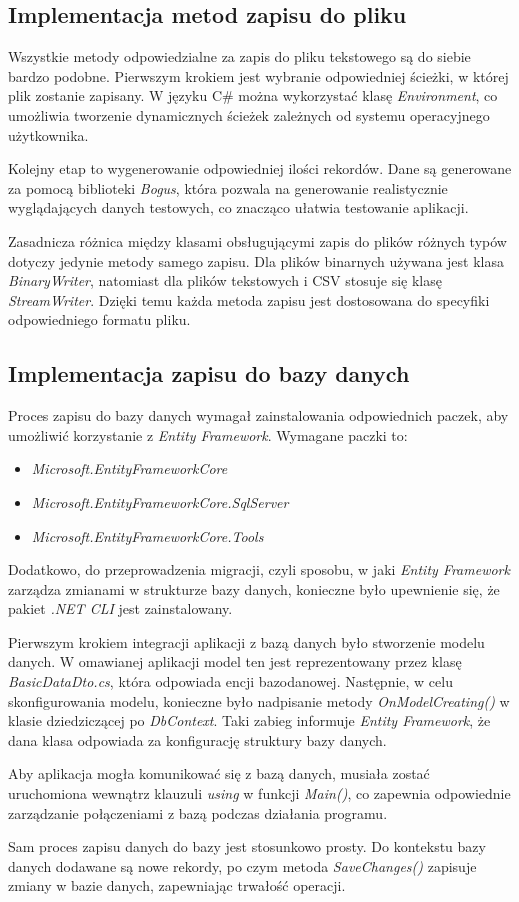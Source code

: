 \documentclass{report}
\begin{document}
\subsection{\Large Implementacja metod zapisu do pliku}

Wszystkie metody odpowiedzialne za zapis do pliku tekstowego są do siebie bardzo podobne. Pierwszym krokiem jest wybranie odpowiedniej ścieżki, w której plik zostanie zapisany. W języku C\# można wykorzystać klasę \textit{Environment}, co umożliwia tworzenie dynamicznych ścieżek zależnych od systemu operacyjnego użytkownika.

Kolejny etap to wygenerowanie odpowiedniej ilości rekordów. Dane są generowane za pomocą biblioteki \textit{Bogus}, która pozwala na generowanie realistycznie wyglądających danych testowych, co znacząco ułatwia testowanie aplikacji.

Zasadnicza różnica między klasami obsługującymi zapis do plików różnych typów dotyczy jedynie metody samego zapisu. Dla plików binarnych używana jest klasa \textit{BinaryWriter}, natomiast dla plików tekstowych i CSV stosuje się klasę \textit{StreamWriter}. Dzięki temu każda metoda zapisu jest dostosowana do specyfiki odpowiedniego formatu pliku.

\subsection{\Large Implementacja zapisu do bazy danych}

Proces zapisu do bazy danych wymagał zainstalowania odpowiednich paczek, aby umożliwić korzystanie z \textit{Entity Framework}. Wymagane paczki to: 
\begin{itemize} 
    \item \textit{Microsoft.EntityFrameworkCore} 
    \item \textit{Microsoft.EntityFrameworkCore.SqlServer} 
    \item \textit{Microsoft.EntityFrameworkCore.Tools} 
\end{itemize}

Dodatkowo, do przeprowadzenia migracji, czyli sposobu, w jaki \textit{Entity Framework} zarządza zmianami w strukturze bazy danych, konieczne było upewnienie się, że pakiet \textit{.NET CLI} jest zainstalowany.

Pierwszym krokiem integracji aplikacji z bazą danych było stworzenie modelu danych. W omawianej aplikacji model ten jest reprezentowany przez klasę \textit{BasicDataDto.cs}, która odpowiada encji bazodanowej. Następnie, w celu skonfigurowania modelu, konieczne było nadpisanie metody \textit{OnModelCreating()} w klasie dziedziczącej po \textit{DbContext}. Taki zabieg informuje \textit{Entity Framework}, że dana klasa odpowiada za konfigurację struktury bazy danych.

Aby aplikacja mogła komunikować się z bazą danych, musiała zostać uruchomiona wewnątrz klauzuli \textit{using} w funkcji \textit{Main()}, co zapewnia odpowiednie zarządzanie połączeniami z bazą podczas działania programu.

Sam proces zapisu danych do bazy jest stosunkowo prosty. Do kontekstu bazy danych dodawane są nowe rekordy, po czym metoda \textit{SaveChanges()} zapisuje zmiany w bazie danych, zapewniając trwałość operacji.
\end{document}

